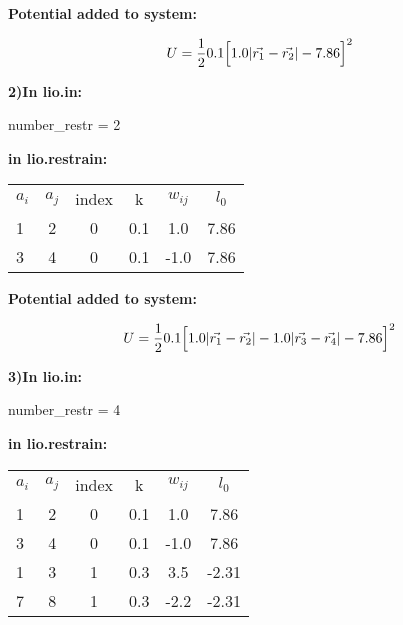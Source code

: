     \textbf{Potential added to system:}

    \begin{equation}
      U=\frac{1}{2} 0.1 \Big{[} 1.0 |\vec{r_1} - \vec{r_2}| - 7.86\Big{]}^2  
      \label{Ex1}
    \end{equation}


    \textbf{2)In lio.in:}

    number\_restr = 2

    \textbf{in lio.restrain:}

    \begin{table}  [H]
      \begin{center}
      \begin{tabular}{ l c c c c c}
         $a_i$ & $a_j$ & index &   k  &    $w_{ij}$   &  $l_0$    \\
         1  &  2 &   0   &  0.1 &    1.0   & 7.86   \\
         3  &  4 &   0   &  0.1 &   -1.0   & 7.86   \\
       \end{tabular}
       \end{center}
      \label{Tex2}
    \end{table}

    \textbf{Potential added to system:}

    \begin{equation}
      U=\frac{1}{2} 0.1 \Big{[} 1.0 |\vec{r_1} - \vec{r_2}| - 1.0 |\vec{r_3} - \vec{r_4}| - 7.86\Big{]}^2  
      \label{Ex2}
    \end{equation}


    \textbf{3)In lio.in:}

    number\_restr = 4

    \textbf{in lio.restrain:}

    \begin{table}  [H]
      \begin{center}
      \begin{tabular}{ l c c c c c}
         $a_i$ & $a_j$ & index &   k  &    $w_{ij}$   &  $l_0$    \\
         1  &  2 &   0   &  0.1 &    1.0   & 7.86   \\
         3  &  4 &   0   &  0.1 &   -1.0   & 7.86   \\
         1  &  3 &   1   &  0.3 &    3.5   & -2.31   \\
         7  &  8 &   1   &  0.3 &   -2.2   & -2.31   \\
       \end{tabular}
       \end{center}
      \label{Tex3}
    \end{table}

